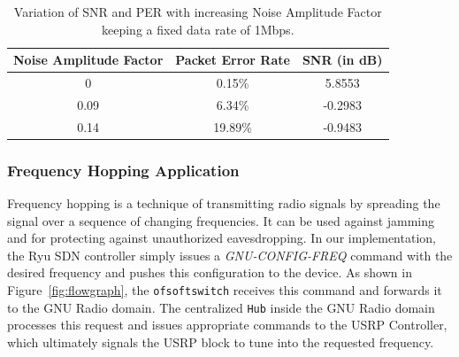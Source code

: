 
\begin{table}[]
\centering
\caption{Variation of SNR and PER with increasing Noise Amplitude Factor keeping a fixed data rate of 1Mbps.}
\label{my-label}
\begin{tabular}{@{}|c|c|c|@{}}
\toprule
Noise Amplitude Factor & Packet Error Rate & SNR (in dB) \\ \midrule
0                      & 0.15\%            & 5.8553                     \\ \midrule
0.09                   & 6.34\%            & -0.2983                    \\ \midrule
0.14                   & 19.89\%           & -0.9483                    \\ \bottomrule
\end{tabular}
 \label{fig:table}
\end{table}



\subsubsection{Frequency Hopping Application}
Frequency hopping is a technique of transmitting radio signals by spreading the signal over a sequence of changing frequencies. It can be used against jamming and for protecting against unauthorized eavesdropping. 
In our implementation, the Ryu SDN controller simply issues a \emph{GNU-CONFIG-FREQ} command with the desired frequency and pushes this configuration to the device. 
As shown in Figure~\ref{fig:flowgraph}, the \texttt{ofsoftswitch} receives this command and forwards it to the GNU Radio domain. The centralized \texttt{\crossflow Hub} inside the GNU Radio domain processes this request and issues appropriate commands to the  USRP Controller, which ultimately signals the USRP block to tune into the requested frequency. 

